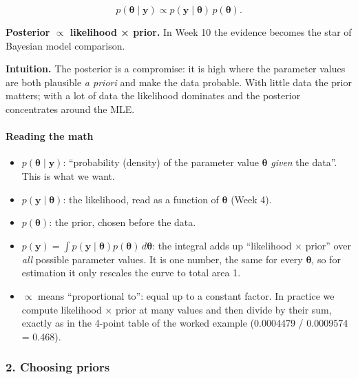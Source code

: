 \[
p(\boldsymbol\theta \mid \mathbf{y}) \propto p(\mathbf{y}\mid\boldsymbol\theta)\, p(\boldsymbol\theta).
\]

\textbf{Posterior \ensuremath{\propto} likelihood × prior.} In Week 10 the evidence becomes
the star of Bayesian model comparison.

\textbf{Intuition.} The posterior is a compromise: it is high where the
parameter values are both plausible \emph{a priori} and make the data
probable. With little data the prior matters; with a lot of data the
likelihood dominates and the posterior concentrates around the MLE.

\paragraph{Reading the math}

\begin{itemize}
\tightlist
\item
  \(p(\boldsymbol\theta \mid \mathbf{y})\): ``probability (density) of
  the parameter value \(\boldsymbol\theta\) \emph{given} the data''.
  This is what we want.
\item
  \(p(\mathbf{y} \mid \boldsymbol\theta)\): the likelihood, read as a
  function of \(\boldsymbol\theta\) (Week 4).
\item
  \(p(\boldsymbol\theta)\): the prior, chosen before the data.
\item
  \(p(\mathbf{y}) = \int p(\mathbf{y}\mid\boldsymbol\theta)p(\boldsymbol\theta)\,d\boldsymbol\theta\):
  the integral adds up ``likelihood × prior'' over \emph{all} possible
  parameter values. It is one number, the same for every
  \(\boldsymbol\theta\), so for estimation it only rescales the curve to
  total area 1.
\item
  \(\propto\) means ``proportional to'': equal up to a constant factor.
  In practice we compute likelihood × prior at many values and then
  divide by their sum, exactly as in the 4-point table of the worked
  example (0.0004479 / 0.0009574 = 0.468).
\end{itemize}

\subsubsection{2. Choosing priors}

